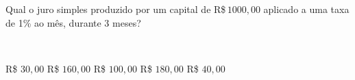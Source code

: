 \parbox{\linewidth}{

Qual o juro simples produzido por um capital de R\$\,$1000{,}00$ aplicado a uma taxa de 1\% ao mês, durante 3 meses?}
\vspace{2mm}
\\\parbox{\linewidth}{

R\$ $30{,}00$
R\$ $160{,}00$
R\$ $100{,}00$
R\$ $180{,}00$
R\$ $40{,}00$

}

